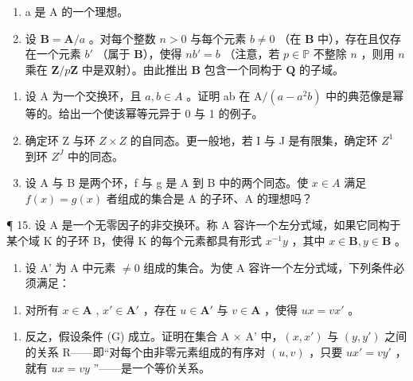\begin{enumerate}
\def\labelenumi{(\alph{enumi})}
\item
  a 是 A 的一个理想。
\item
  设 \(\mathbf{B} = \mathbf{A} / a\) 。对每个整数 \(n > 0\) 与每个元素 \(b \neq 0\) （在 \(\mathbf{B}\) 中），存在且仅存在一个元素 \(b'\) （属于 \(\mathbf{B}\)），使得 \(nb' = b\) （注意，若 \(p \in \mathbb{P}\) 不整除 \(n\) ，则用 \(n\) 乘在 \(\mathbf{Z} / p\mathbf{Z}\) 中是双射）。由此推出 \(\mathbf{B}\) 包含一个同构于 \(\mathbf{Q}\) 的子域。
\end{enumerate}

\begin{enumerate}
\def\labelenumi{\arabic{enumi}.}
\setcounter{enumi}{11}
\item
  设 A 为一个交换环，且 \(a, b \in A\) 。证明 ab 在 \(\mathrm{A}/(a - a^{2}b)\) 中的典范像是幂等的。给出一个使该幂等元异于 0 与 1 的例子。
\item
  确定环 Z 与环 \(Z \times Z\) 的自同态。更一般地，若 I 与 J 是有限集，确定环 \(Z^{1}\) 到环 \(Z^{J}\) 中的同态。
\item
  设 A 与 B 是两个环，f 与 g 是 A 到 B 中的两个同态。使 \(x \in A\) 满足 \(f(x) = g(x)\) 者组成的集合是 A 的子环、A 的理想吗？
\end{enumerate}

¶ 15. 设 A 是一个无零因子的非交换环。称 A 容许一个左分式域，如果它同构于某个域 K 的子环 B，使得 K 的每个元素都具有形式 \(x^{-1}y\) ，其中 \(x \in \mathbf{B}, y \in \mathbf{B}\) 。

\begin{enumerate}
\def\labelenumi{(\alph{enumi})}
\tightlist
\item
  设 A' 为 A 中元素 \(\neq0\) 组成的集合。为使 A 容许一个左分式域，下列条件必须满足：
\end{enumerate}

\begin{enumerate}
\def\labelenumi{(\Alph{enumi})}
\setcounter{enumi}{6}
\tightlist
\item
  对所有 \(x \in \mathbf{A}\) , \(x' \in \mathbf{A}'\) ，存在 \(u \in \mathbf{A}'\) 与 \(v \in \mathbf{A}\) ，使得 \(ux = vx'\) 。
\end{enumerate}

\begin{enumerate}
\def\labelenumi{(\alph{enumi})}
\setcounter{enumi}{1}
\tightlist
\item
  反之，假设条件 (G) 成立。证明在集合 A × A' 中，\((x, x')\) 与 \((y, y')\) 之间的关系 R——即“对每个由非零元素组成的有序对 \((u, v)\) ，只要 \(ux' = vy'\) ，就有 \(ux = vy\) ”——是一个等价关系。
\end{enumerate}

